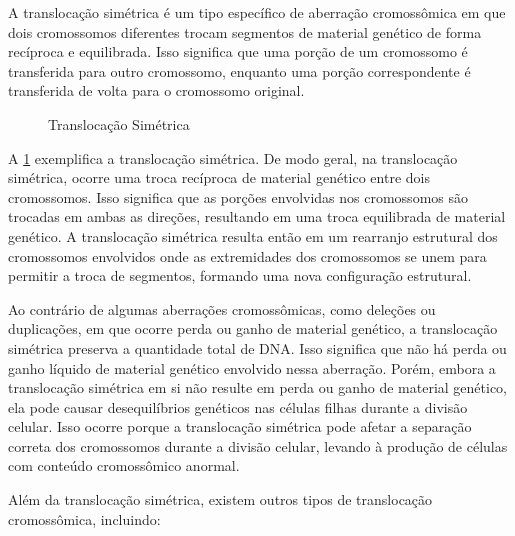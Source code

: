 \documentclass[11pt,a4paper]{article}
\begin{document}
	A translocação simétrica é um tipo específico de aberração cromossômica em que dois cromossomos diferentes trocam segmentos de material genético de forma recíproca e equilibrada. Isso significa que uma porção de um cromossomo é transferida para outro cromossomo, enquanto uma porção correspondente é transferida de volta para o cromossomo original.

	\begin{figure}
		\caption{Translocação Simétrica	}
		\label{fig:translocacaoSimetrica}
	\end{figure}

	A \ref{fig:translocacaoSimetrica} exemplifica a translocação simétrica. De modo geral, na translocação simétrica, ocorre uma troca recíproca de material genético entre dois cromossomos. Isso significa que as porções envolvidas nos cromossomos são trocadas em ambas as direções, resultando em uma troca equilibrada de material genético. A translocação simétrica resulta então em um rearranjo estrutural dos cromossomos envolvidos onde as extremidades dos cromossomos se unem para permitir a troca de segmentos, formando uma nova configuração estrutural.
	
	Ao contrário de algumas aberrações cromossômicas, como deleções ou duplicações, em que ocorre perda ou ganho de material genético, a translocação simétrica preserva a quantidade total de DNA. Isso significa que não há perda ou ganho líquido de material genético envolvido nessa aberração. Porém, embora a translocação simétrica em si não resulte em perda ou ganho de material genético, ela pode causar desequilíbrios genéticos nas células filhas durante a divisão celular. Isso ocorre porque a translocação simétrica pode afetar a separação correta dos cromossomos durante a divisão celular, levando à produção de células com conteúdo cromossômico anormal.

	Além da translocação simétrica, existem outros tipos de translocação cromossômica, incluindo:
\end{document}
